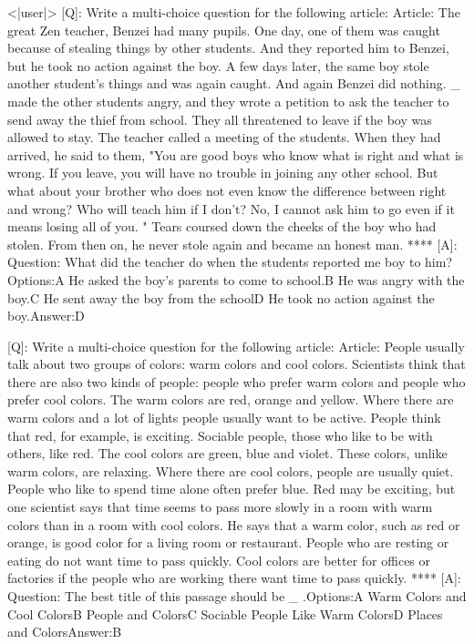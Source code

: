 \documentclass{article}
\begin{document}
\begin{tcolorbox}[colframe=black,colback=white]
<|user|>
[Q]: Write a multi-choice question for the following article: Article: The great Zen teacher, Benzei had many pupils. One day, one of them was caught because of stealing things by other students. And they reported him to Benzei, but he took no action against the boy. A few days later, the same boy stole another student's things and was again caught. And again Benzei did nothing. \_ made the other students angry, and they wrote a petition  to ask the teacher to send away the thief from school. They all threatened to leave if the boy was allowed to stay. The teacher called a meeting of the students. When they had arrived, he said to them, "You are good boys who know what is right and what is wrong. If you leave, you will have no trouble in joining any other school. But what about your brother who does not even know the difference between right and wrong? Who will teach him if I don't? No, I cannot ask him to go even if it means losing all of you. " Tears coursed down  the cheeks of the boy who had stolen. From then on, he never stole again and became an honest man.
****
[A]: Question: What did the teacher do when the students reported me boy to him?Options:A He asked the boy's parents to come to school.B He was angry with the boy.C He sent away the boy from the schoolD He took no action against the boy.Answer:D


[Q]: Write a multi-choice question for the following article: Article: People usually talk about two groups of colors: warm colors and cool colors. Scientists think that there are also two kinds of people: people who prefer warm colors and people who prefer cool colors. The warm colors are red, orange and yellow. Where there are warm colors and a lot of lights people usually want to be active. People think that red, for example, is exciting. Sociable people, those who like to be with others, like red. The cool colors are green, blue and violet. These colors, unlike warm colors, are relaxing. Where there are cool colors, people are usually quiet. People who like to spend time alone often prefer blue. Red may be exciting, but one scientist says that time seems to pass more slowly in a room with warm colors than in a room with cool colors. He says that a warm color, such as red or orange, is good color for a living room or restaurant. People who are resting or eating do not want time to pass quickly. Cool colors are better for offices or factories if the people who are working there want time to pass quickly.
****
[A]: Question: The best title of this passage should be   \_ .Options:A Warm Colors and Cool ColorsB People and ColorsC Sociable People Like Warm ColorsD Places and ColorsAnswer:B



\end{tcolorbox}
\end{document}
